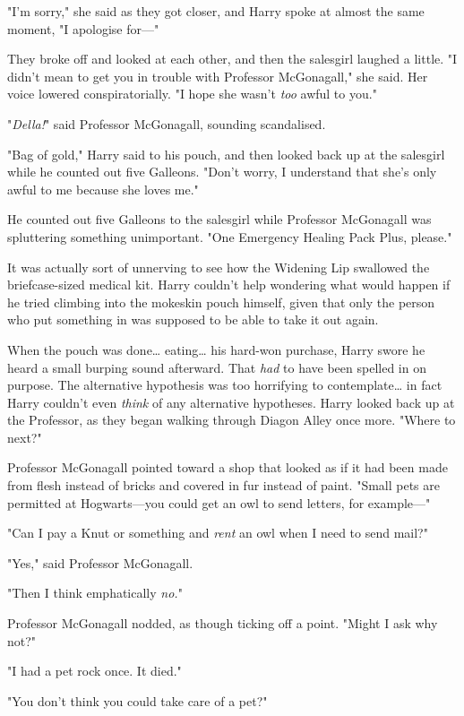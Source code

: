 "I'm sorry," she said as they got closer, and Harry spoke at almost the same
moment, "I apologise for---"

They broke off and looked at each other, and then the salesgirl laughed a
little. "I didn't mean to get you in trouble with Professor McGonagall," she
said. Her voice lowered conspiratorially. "I hope she wasn't \emph{too} awful
to you."

"\emph{Della!}" said Professor McGonagall, sounding scandalised.

"Bag of gold," Harry said to his pouch, and then looked back up at the
salesgirl while he counted out five Galleons. "Don't worry, I understand that
she's only awful to me because she loves me."

He counted out five Galleons to the salesgirl while Professor McGonagall was
spluttering something unimportant. "One Emergency Healing Pack Plus, please."

It was actually sort of unnerving to see how the Widening Lip swallowed the
briefcase-sized medical kit. Harry couldn't help wondering what would happen if
he tried climbing into the mokeskin pouch himself, given that only the person
who put something in was supposed to be able to take it out again.

When the pouch was done{\ldots} eating{\ldots} his hard-won purchase, Harry
swore he heard a small burping sound afterward. That \emph{had} to have been
spelled in on purpose. The alternative hypothesis was too horrifying to
contemplate{\ldots} in fact Harry couldn't even \emph{think} of any alternative
hypotheses. Harry looked back up at the Professor, as they began walking
through Diagon Alley once more. "Where to next?"

Professor McGonagall pointed toward a shop that looked as if it had been made
from flesh instead of bricks and covered in fur instead of paint. "Small pets
are permitted at Hogwarts---you could get an owl to send letters, for
example---"

"Can I pay a Knut or something and \emph{rent} an owl when I need to send mail?"

"Yes," said Professor McGonagall.

"Then I think emphatically \emph{no.}"

Professor McGonagall nodded, as though ticking off a point. "Might I ask why
not?"

"I had a pet rock once. It died."

"You don't think you could take care of a pet?"

